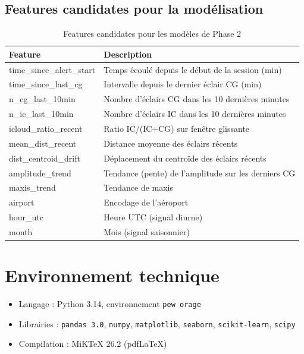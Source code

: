 \documentclass[11pt,a4paper]{article}
\begin{document}
\subsection{Features candidates pour la modélisation}

\begin{table}[H]
\centering
\renewcommand{\arraystretch}{1.3}
\begin{tabularx}{\linewidth}{>{\ttfamily\small}lX}
\toprule
\textbf{Feature} & \textbf{Description} \\
\midrule
time\_since\_alert\_start & Temps écoulé depuis le début de la session (min) \\
time\_since\_last\_cg & Intervalle depuis le dernier éclair CG (min) \\
n\_cg\_last\_10min & Nombre d'éclairs CG dans les 10 dernières minutes \\
n\_ic\_last\_10min & Nombre d'éclairs IC dans les 10 dernières minutes \\
icloud\_ratio\_recent & Ratio IC/(IC+CG) sur fenêtre glissante \\
mean\_dist\_recent & Distance moyenne des éclairs récents \\
dist\_centroid\_drift & Déplacement du centroïde des éclairs récents \\
amplitude\_trend & Tendance (pente) de l'amplitude sur les derniers CG \\
maxis\_trend & Tendance de maxis \\
airport & Encodage de l'aéroport \\
hour\_utc & Heure UTC (signal diurne) \\
month & Mois (signal saisonnier) \\
\bottomrule
\end{tabularx}
\caption{Features candidates pour les modèles de Phase 2}
\end{table}

\appendix
\section{Environnement technique}

\begin{itemize}
  \item Langage : Python 3.14, environnement \texttt{pew orage}
  \item Librairies : \texttt{pandas 3.0}, \texttt{numpy}, \texttt{matplotlib}, 
    \texttt{seaborn}, \texttt{scikit-learn}, \texttt{scipy}
  \item Compilation : MiKTeX 26.2 (pdfLaTeX)
\end{itemize}
\end{document}
